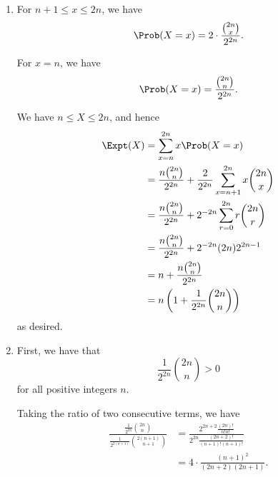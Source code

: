 \begin{enumerate}
    \item For \(n + 1 \leq x \leq 2n\), we have
          \[
              \Prob(X = x) = 2 \cdot \frac{\binom{2n}{x}}{2^{2n}}.
          \]

          For \(x = n\), we have
          \[
              \Prob(X = x) = \frac{\binom{2n}{n}}{2^{2n}}.
          \]

          We have \(n \leq X \leq 2n\), and hence
          \begin{align*}
              \Expt(X) & = \sum_{x = n}^{2n} x \Prob(X = x)                                                        \\
                       & = \frac{n \binom{2n}{n}}{2^{2n}} + \frac{2}{2^{2n}} \sum_{x = n + 1}^{2n} x \binom{2n}{x} \\
                       & = \frac{n \binom{2n}{n}}{2^{2n}} + 2^{-2n} \sum_{r = 0}^{2n} r \binom{2n}{r}              \\
                       & = \frac{n \binom{2n}{n}}{2^{2n}} + 2^{-2n} (2n) 2^{2n - 1}                                \\
                       & = n + \frac{n \binom{2n}{n}}{2^{2n}}                                                      \\
                       & = n \left(1 + \frac{1}{2^{2n}} \binom{2n}{n}\right)
          \end{align*}
          as desired.

    \item First, we have that
          \[
              \frac{1}{2^{2n}} \binom{2n}{n} > 0
          \]
          for all positive integers \(n\).

          Taking the ratio of two consecutive terms, we have
          \begin{align*}
              \frac{\frac{1}{2^{2n}} \binom{2n}{n}}{\frac{1}{2^{2(n + 1)}} \binom{2(n + 1)}{n + 1}} & = \frac{2^{2n + 2} \frac{(2n)!}{n! n!}}{2^{2n} \frac{(2n + 2)!}{(n + 1)! (n + 1)!}} \\
                                                                                                    & = 4 \cdot \frac{(n + 1)^2}{(2n + 2) (2n + 1)}.
          \end{align*}


\end{enumerate}
